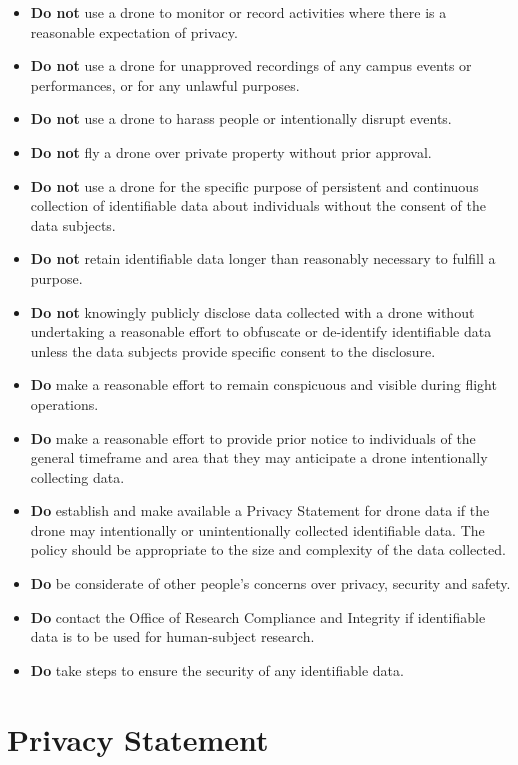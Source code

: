 \documentclass[
  12pt,
]{book}
\begin{document}
\begin{itemize}
\item
  \textbf{Do not} use a drone to monitor or record activities where there is a reasonable expectation of privacy.
\item
  \textbf{Do not} use a drone for unapproved recordings of any campus events or performances, or for any unlawful purposes.
\item
  \textbf{Do not} use a drone to harass people or intentionally disrupt events.
\item
  \textbf{Do not} fly a drone over private property without prior approval.
\item
  \textbf{Do not} use a drone for the specific purpose of persistent and continuous collection of identifiable data about individuals without the consent of the data subjects.
\item
  \textbf{Do not} retain identifiable data longer than reasonably necessary to fulfill a purpose.
\item
  \textbf{Do not} knowingly publicly disclose data collected with a drone without undertaking a reasonable effort to obfuscate or de-identify identifiable data unless the data subjects provide specific consent to the disclosure.
\item
  \textbf{Do} make a reasonable effort to remain conspicuous and visible during flight operations.
\item
  \textbf{Do} make a reasonable effort to provide prior notice to individuals of the general timeframe and area that they may anticipate a drone intentionally collecting data.
\item
  \textbf{Do} establish and make available a Privacy Statement for drone data if the drone may intentionally or unintentionally collected identifiable data. The policy should be appropriate to the size and complexity of the data collected.
\item
  \textbf{Do} be considerate of other people's concerns over privacy, security and safety.
\item
  \textbf{Do} contact the Office of Research Compliance and Integrity if identifiable data is to be used for human-subject research.
\item
  \textbf{Do} take steps to ensure the security of any identifiable data.
\end{itemize}

\section{Privacy Statement}\label{privacy-statement}
\end{document}
